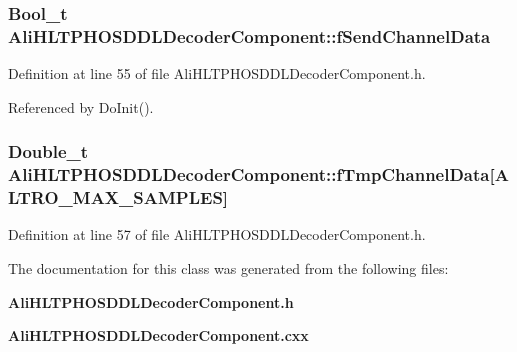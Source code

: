 \subsubsection{\setlength{\rightskip}{0pt plus 5cm}Bool\_\-t {\bf Ali\-HLTPHOSDDLDecoder\-Component::f\-Send\-Channel\-Data}\hspace{0.3cm}{\tt  [private]}}\label{classAliHLTPHOSDDLDecoderComponent_r6}




Definition at line 55 of file Ali\-HLTPHOSDDLDecoder\-Component.h.

Referenced by Do\-Init().
\subsubsection{\setlength{\rightskip}{0pt plus 5cm}Double\_\-t {\bf Ali\-HLTPHOSDDLDecoder\-Component::f\-Tmp\-Channel\-Data}[ALTRO\_\-MAX\_\-SAMPLES]\hspace{0.3cm}{\tt  [private]}}\label{classAliHLTPHOSDDLDecoderComponent_r8}




Definition at line 57 of file Ali\-HLTPHOSDDLDecoder\-Component.h.

The documentation for this class was generated from the following files:\begin{CompactItemize}
\item 
{\bf Ali\-HLTPHOSDDLDecoder\-Component.h}\item 
{\bf Ali\-HLTPHOSDDLDecoder\-Component.cxx}\end{CompactItemize}
